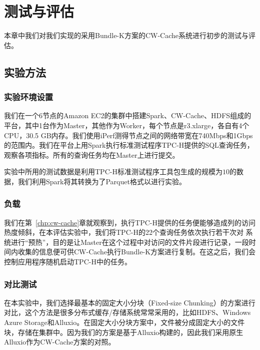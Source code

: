 \chapter{测试与评估}

\par 本章中我们对我们实现的采用Bundle-K方案的CW-Cache系统进行初步的测试与评估。

\section{实验方法}

\subsection{实验环境设置}

\par 我们在一个6节点的Amazon EC2的集群中搭建Spark、CW-Cache、HDFS组成的平台，其中1台作为Master，其他作为Worker，每个节点是r3.xlarge，各自有4个CPU，30.5 GB内存。我们使用iPerf测得节点之间的网络带宽在740Mbps和1Gbps的范围内。我们在平台上用Spark执行标准测试程序TPC-H提供的SQL查询任务，观察各项指标。所有的查询任务均在Master上进行提交。

\par 实验中所用的测试数据是利用TPC-H标准测试程序工具包生成的规模为$10$的数据，我们利用Spark将其转换为了Parquet格式以进行实验。

\subsection{负载}

\par 我们在第~\ref{chp:cw-cache}章就观察到，执行TPC-H提供的任务便能够造成列的访问热度倾斜，在本评估实验中，我们将TPC-H的22个查询任务依次执行若干次对 系统进行“预热”，目的是让Master在这个过程中对访问的文件片段进行记录，一段时间内收集的信息便可供CW-Cache执行Bundle-K方案进行复制。在这之后，我们会控制应用程序随机启动TPC-H中的任务。

\subsection{对比测试}

\par 在本实验中，我们选择最基本的固定大小分块（Fixed-size Chunking）的方案进行对比，这个方法是很多分布式缓存/存储系统常常采用的，比如HDFS、Windows Azure Storage和Alluxio。在固定大小分块方案中，文件被分成固定大小的文件块，存储在集群中。因为我们的方案是基于Alluxio构建的，因此我们采用原生Alluxio作为CW-Cache方案的对照。

